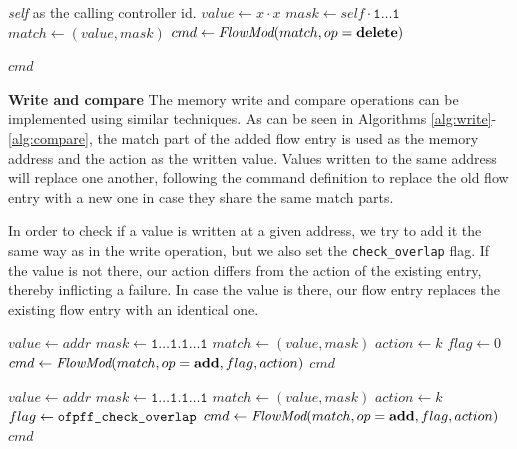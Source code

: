 \documentclass[conference]{sigcomm-alternate}
\newcommand{\concat}[0]{\cdot}
\newcommand{\compare}{compare\xspace}
\newcommand{\memwrite}{write\xspace}
\newcommand{\addr}{\textit{addr}\xspace}
\newcommand{\add}{\textbf{add}\xspace}
\newcommand{\dele}{\textbf{delete}\xspace}
\newcommand{\checko}{\texttt{check\_overlap}\xspace}
\begin{document}
\begin{algorithm}[t]
    \caption{$\textit{unclaim}(x)$}
    \label{alg:unclaim}
    \begin{algorithmic}[1]
    \Require \emph{self} as the calling controller id.
    		\State $value \gets x\concat x$
    		\State $mask \gets self\concat \texttt{1$\ldots$1}$
    		\State $match \gets (value,mask)$
    		\State $cmd\gets \emph{FlowMod}(match, op=\dele) $
    	
			
			\Return $cmd$
    \end{algorithmic}
\end{algorithm}

\noindent\textbf{Write and compare}
The memory \memwrite and \compare
 operations can be implemented using similar techniques.
 As can be seen in Algorithms \ref{alg:write}-\ref{alg:compare},
  the match part of the added flow entry is used as the memory address and the action as
  the written value. Values written to the same address will replace one another,
following the command definition to replace the old flow entry with a new one in case they
share the same match parts.

In order to check if a value is written at a given address,
we try to add it the same way as in the \memwrite operation,
but we also set the \texttt{\checko} flag. If the value is not there,
our action differs from the action of the existing entry,
thereby inflicting a failure.
In case the value is there, our flow entry replaces the existing flow entry
with an identical one.


\begin{algorithm}[t]
    \caption{$\textit{write}(\addr,k)$}
    \label{alg:write}
    \begin{algorithmic}[1]
    		\State $value \gets \addr$
    		\State $mask \gets  \texttt{1$\ldots$1}. \texttt{1$\ldots$1}$
    		\State $match \gets (value,mask)$
    		\State $action \gets k$
    		\State $flag \gets 0$
    		\State $cmd\gets \emph{FlowMod}(match, op = \add, flag, action) $
			\Return $cmd$
    \end{algorithmic}
\end{algorithm}

\begin{algorithm}[t]
    \caption{$\textit{\compare}(\addr,k)$}
    \label{alg:compare}
    \begin{algorithmic}[1]
    		\State $value \gets \addr$
    		\State $mask \gets  \texttt{1$\ldots$1}.\texttt{1$\ldots$1}$
    		\State $match \gets (value,mask)$
    		\State $action \gets k$
    		\State $flag \gets \texttt{ofpff\_\checko}$
    		\State $cmd\gets \emph{FlowMod}(match, op = \add, flag, action) $
			\Return $cmd$
    \end{algorithmic}
\end{algorithm}
\end{document}
